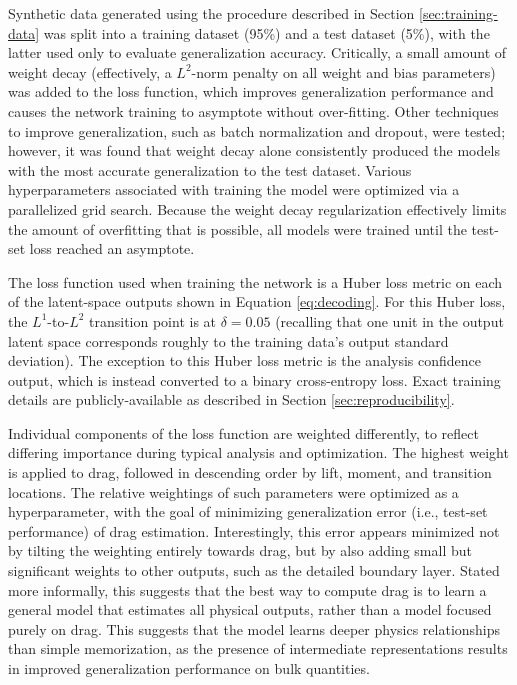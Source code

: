 \documentclass[journal]{new-aiaa}
\begin{document}
Synthetic data generated using the procedure described in Section \ref{sec:training-data} was split into a training dataset (95\%) and a test dataset (5\%), with the latter used only to evaluate generalization accuracy. Critically, a small amount of weight decay (effectively, a $L^2$-norm penalty on all weight and bias parameters) was added to the loss function, which improves generalization performance and causes the network training to asymptote without over-fitting. Other techniques to improve generalization, such as batch normalization and dropout, were tested; however, it was found that weight decay alone consistently produced the models with the most accurate generalization to the test dataset. Various hyperparameters associated with training the model were optimized via a parallelized grid search. Because the weight decay regularization effectively limits the amount of overfitting that is possible, all models were trained until the test-set loss reached an asymptote.

The loss function used when training the network is a Huber loss metric on each of the latent-space outputs shown in Equation \ref{eq:decoding}. For this Huber loss, the $L^1$-to-$L^2$ transition point is at $\delta=0.05$ (recalling that one unit in the output latent space corresponds roughly to the training data's output standard deviation). The exception to this Huber loss metric is the analysis confidence output, which is instead converted to a binary cross-entropy loss. Exact training details are publicly-available as described in Section \ref{sec:reproducibility}.

Individual components of the loss function are weighted differently, to reflect differing importance during typical analysis and optimization. The highest weight is applied to drag, followed in descending order by lift, moment, and transition locations. The relative weightings of such parameters were optimized as a hyperparameter, with the goal of minimizing generalization error (i.e., test-set performance) of drag estimation. Interestingly, this error appears minimized not by tilting the weighting entirely towards drag, but by also adding small but significant weights to other outputs, such as the detailed boundary layer. Stated more informally, this suggests that the best way to compute drag is to learn a general model that estimates all physical outputs, rather than a model focused purely on drag. This suggests that the model learns deeper physics relationships than simple memorization, as the presence of intermediate representations results in improved generalization performance on bulk quantities.
\end{document}
